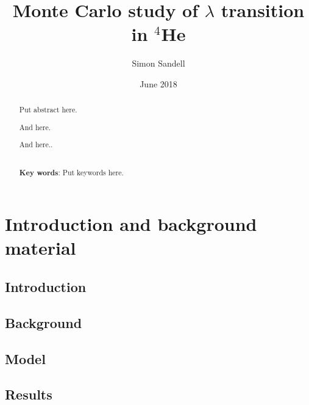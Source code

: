 \documentclass[nocoverpage,swedish,g5paper]{thesis}
\title{Monte Carlo study of $\lambda$ transition in $^{4}$He}
\author{Simon Sandell}
\date{June 2018}
\newcommand{\todo}[1]{(\textbf{TODO:} #1)}
\begin{document}

\begin{abstract}
Put abstract here.

And here.

And here..
\\\noindent \strut \\
{\bf Key words}: Put keywords here.
\end{abstract}


\begin{preface}

\end{preface}

\tableofcontents

\mainmatter

\part{Introduction and background material}

\chapter{Introduction}


\chapter{Background}\label{ch:ExtraDimensions}


\chapter{Model}\label{ch:DarkMatter}


\chapter{Results}\label{ch:ColliderPhenomenology}

\end{document}
